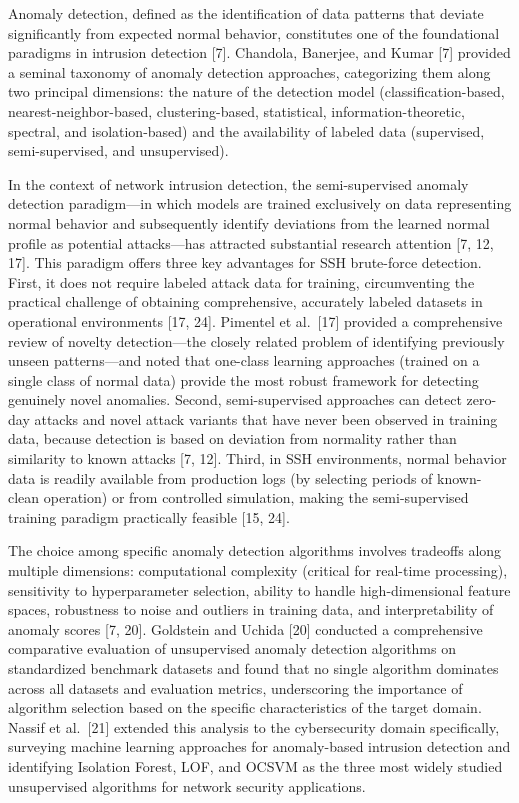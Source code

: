 \documentclass[
  a4paper]{report}
\begin{document}
Anomaly detection, defined as the identification of data patterns that
deviate significantly from expected normal behavior, constitutes one of
the foundational paradigms in intrusion detection {[}7{]}. Chandola,
Banerjee, and Kumar {[}7{]} provided a seminal taxonomy of anomaly
detection approaches, categorizing them along two principal dimensions:
the nature of the detection model (classification-based,
nearest-neighbor-based, clustering-based, statistical,
information-theoretic, spectral, and isolation-based) and the
availability of labeled data (supervised, semi-supervised, and
unsupervised).

In the context of network intrusion detection, the semi-supervised
anomaly detection paradigm---in which models are trained exclusively on
data representing normal behavior and subsequently identify deviations
from the learned normal profile as potential attacks---has attracted
substantial research attention {[}7, 12, 17{]}. This paradigm offers
three key advantages for SSH brute-force detection. First, it does not
require labeled attack data for training, circumventing the practical
challenge of obtaining comprehensive, accurately labeled datasets in
operational environments {[}17, 24{]}. Pimentel et al.~{[}17{]} provided
a comprehensive review of novelty detection---the closely related
problem of identifying previously unseen patterns---and noted that
one-class learning approaches (trained on a single class of normal data)
provide the most robust framework for detecting genuinely novel
anomalies. Second, semi-supervised approaches can detect zero-day
attacks and novel attack variants that have never been observed in
training data, because detection is based on deviation from normality
rather than similarity to known attacks {[}7, 12{]}. Third, in SSH
environments, normal behavior data is readily available from production
logs (by selecting periods of known-clean operation) or from controlled
simulation, making the semi-supervised training paradigm practically
feasible {[}15, 24{]}.

The choice among specific anomaly detection algorithms involves
tradeoffs along multiple dimensions: computational complexity (critical
for real-time processing), sensitivity to hyperparameter selection,
ability to handle high-dimensional feature spaces, robustness to noise
and outliers in training data, and interpretability of anomaly scores
{[}7, 20{]}. Goldstein and Uchida {[}20{]} conducted a comprehensive
comparative evaluation of unsupervised anomaly detection algorithms on
standardized benchmark datasets and found that no single algorithm
dominates across all datasets and evaluation metrics, underscoring the
importance of algorithm selection based on the specific characteristics
of the target domain. Nassif et al.~{[}21{]} extended this analysis to
the cybersecurity domain specifically, surveying machine learning
approaches for anomaly-based intrusion detection and identifying
Isolation Forest, LOF, and OCSVM as the three most widely studied
unsupervised algorithms for network security applications.
\end{document}

